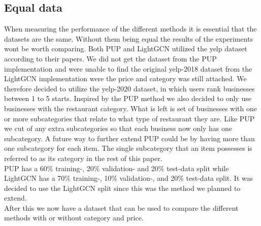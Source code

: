 \subsection{Equal data} \label{equal-data}
When measuring the performance of the different methods it is essential that the datasets are the same.
Without them being equal the results of the experiments wont be worth comparing.
Both PUP and LightGCN utilized the yelp dataset according to their papers.
We did not get the dataset from the PUP implementation and were unable to find the original yelp-2018 dataset from the LightGCN implementation were the price and category was still attached.
We therefore decided to utilize the yelp-2020 dataset, in which users rank businesses between 1 to 5 starts.
Inspired by the PUP method we also decided to only use businesses with the restaurant category.
What is left is set of businesses with one or more subcategories that relate to what type of restaurant they are.
Like PUP we cut of any extra subcategories so that each business now only has one subcategory.
A future way to further extend PUP could be by having more than one subcategory for each item.
The single subcategory that an item possesses is referred to as its category in the rest of this paper.
\\
PUP has a 60\% training-, 20\% validation- and 20\% test-data split while LightGCN has a 70\% training-, 10\% validation-, and 20\% test-data split.
It was decided to use the LightGCN split since this was the method we planned to extend.
\\
After this we now have a dataset that can be used to compare the different methods with or without category and price.

